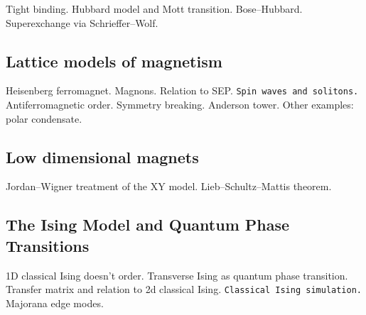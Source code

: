 Tight binding. Hubbard model and Mott transition. Bose--Hubbard. Superexchange via Schrieffer--Wolf.

\subsection{Lattice models of magnetism}

Heisenberg ferromagnet. Magnons. Relation to SEP. \verb|Spin waves and solitons.|
Antiferromagnetic order. Symmetry breaking. Anderson tower. Other examples: polar condensate.

\subsection{Low dimensional magnets}

Jordan--Wigner treatment of the XY model. Lieb--Schultz--Mattis theorem.

\subsection{The Ising Model and Quantum Phase Transitions}

1D classical Ising doesn't order. Transverse Ising as quantum phase transition. Transfer matrix and relation to 2d classical Ising. \verb|Classical Ising simulation.| Majorana edge modes.








